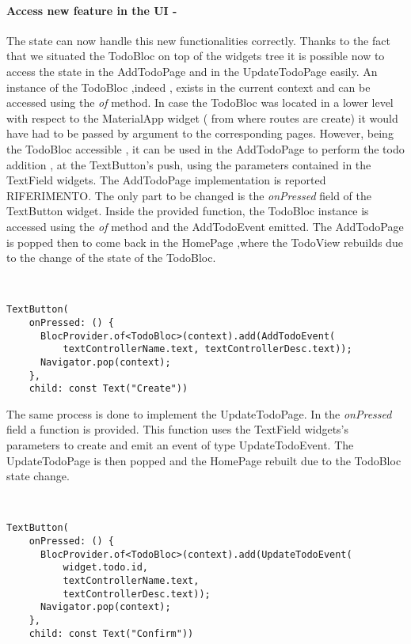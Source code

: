 \paragraph{Access new feature in the UI - }\label{subpar:todo_app_bloc_core_state}

The state can now handle this new functionalities correctly. Thanks to the fact that we situated the TodoBloc on top of the widgets tree it is possible now to access the state in the AddTodoPage and in the UpdateTodoPage easily. An instance of the TodoBloc ,indeed , exists in the current context and can be accessed using the \textit{of} method. In case the TodoBloc was located in a lower level with respect to the MaterialApp widget ( from where routes are create)  it would have had to be passed by argument to the corresponding pages. However, being the TodoBloc accessible , it can be used in the AddTodoPage to perform the todo addition , at the TextButton’s push, using the parameters contained in the TextField widgets. The AddTodoPage implementation is reported RIFERIMENTO. The only part to be changed is the \textit{onPressed} field of the TextButton widget. Inside the provided function, the TodoBloc instance is accessed using the \textit{of} method and the AddTodoEvent emitted. The AddTodoPage is popped then to come back in the HomePage ,where the TodoView rebuilds due to the change of the state of the TodoBloc.
\begin{code}
\mbox{}\\
 \mbox{}
\label{code:2.14}
\begin{verbatim}
TextButton(
    onPressed: () {
      BlocProvider.of<TodoBloc>(context).add(AddTodoEvent(
          textControllerName.text, textControllerDesc.text));
      Navigator.pop(context);
    },
    child: const Text("Create"))
\end{verbatim}
\mbox{}
\end{code}

The same process is done to implement the UpdateTodoPage. In the \textit{onPressed} field a function is provided. This function uses the TextField widgets’s parameters to create and emit an event of type UpdateTodoEvent. The UpdateTodoPage is then popped and the HomePage rebuilt due to the TodoBloc state change.
\begin{code}
\mbox{}\\
 \mbox{}
\label{code:2.14}
\begin{verbatim}
TextButton(
    onPressed: () {
      BlocProvider.of<TodoBloc>(context).add(UpdateTodoEvent(
          widget.todo.id,
          textControllerName.text,
          textControllerDesc.text));
      Navigator.pop(context);
    },
    child: const Text("Confirm"))
\end{verbatim}
\mbox{}
\end{code}


